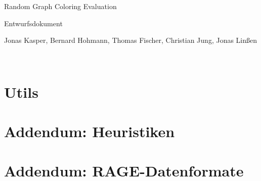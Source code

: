 \documentclass{article}
\newcommand{\titlesize}{\fontsize{30pt}{20pt}\selectfont}
\newcommand{\themesize}{\fontsize{20pt}{20pt}\selectfont}
\newcommand{\authorsize}{\fontsize{15pt}{20pt}\selectfont}
\begin{document}
	
	
	\begin{titlepage}
		
		\titlesize \hspace*{.5cm} Random Graph Coloring Evaluation
		~\newline~\newline
		
		\themesize \hspace*{3cm} Entwurfsdokument
		\newline~\newline
		
		\authorsize Jonas Kasper, Bernard Hohmann, Thomas Fischer, Christian Jung, Jonas Linßen
	\end{titlepage}
	
	\tableofcontents
	\newpage
	
		
	
	~\newpage
	
	
	
	
	
	

	

	
%

	\section{Utils}
	\section{Addendum: Heuristiken}
	\section{Addendum: RAGE-Datenformate}
	
\end{document}
